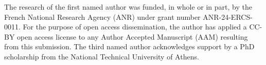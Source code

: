 \documentclass[11pt,leqno]{article}
\theoremstyle{definition}
\theoremstyle{remark}
\numberwithin{equation}{section}
\newcommand{\1}{\textbf{1}}
\begin{document}
\bigskip

 The research of the first named author was funded, in whole or in part, by the French National Research Agency (ANR) under grant number ANR-24-ERCS-0011. For the purpose of open access dissemination, the author has applied a CC-BY open access license to any Author Accepted Manuscript (AAM) resulting from this submission. The third named author acknowledges support by a PhD scholarship from the National Technical University of Athens.


\bigskip 

\end{document}
